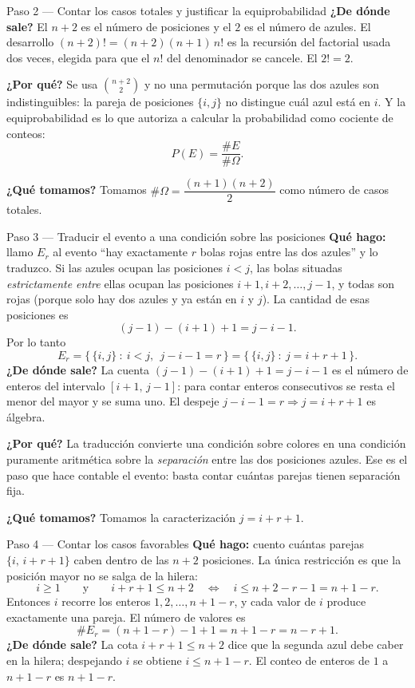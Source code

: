 \documentclass[11pt]{article}
\begin{document}
\begin{sol}
\begin{paso}{Paso 2 --- Contar los casos totales y justificar la equiprobabilidad}
\textbf{¿De dónde sale?} El $n+2$ es el número de posiciones y el $2$ es el número de azules.
El desarrollo $(n+2)!=(n+2)(n+1)\,n!$ es la recursión del factorial usada dos veces, elegida
para que el $n!$ del denominador se cancele. El $2!=2$.

\textbf{¿Por qué?} Se usa $\binom{n+2}{2}$ y no una permutación porque las dos azules son
indistinguibles: la pareja de posiciones $\{i,j\}$ no distingue cuál azul está en $i$. Y la
equiprobabilidad es lo que autoriza a calcular la probabilidad como cociente de conteos:
\[
P(E)=\frac{\#E}{\#\Omega}.
\]

\textbf{¿Qué tomamos?} Tomamos $\#\Omega=\dfrac{(n+1)(n+2)}{2}$ como número de casos totales.
\end{paso}

\begin{paso}{Paso 3 --- Traducir el evento a una condición sobre las posiciones}
\textbf{Qué hago:} llamo $E_r$ al evento ``hay exactamente $r$ bolas rojas entre las dos
azules'' y lo traduzco. Si las azules ocupan las posiciones $i<j$, las bolas situadas
\emph{estrictamente entre} ellas ocupan las posiciones $i+1,i+2,\dots,j-1$, y todas son rojas
(porque solo hay dos azules y ya están en $i$ y $j$). La cantidad de esas posiciones es
\[
(j-1)-(i+1)+1=j-i-1 .
\]
Por lo tanto
\[
E_r=\bigl\{\,\{i,j\}\ :\ i<j,\ \ j-i-1=r\,\bigr\}
=\bigl\{\,\{i,j\}\ :\ j=i+r+1\,\bigr\}.
\]
\textbf{¿De dónde sale?} La cuenta $(j-1)-(i+1)+1=j-i-1$ es el número de enteros del intervalo
$[i+1,\,j-1]$: para contar enteros consecutivos se resta el menor del mayor y se suma uno. El
despeje $j-i-1=r\Rightarrow j=i+r+1$ es álgebra.

\textbf{¿Por qué?} La traducción convierte una condición sobre colores en una condición
puramente aritmética sobre la \emph{separación} entre las dos posiciones azules. Ese es el
paso que hace contable el evento: basta contar cuántas parejas tienen separación fija.

\textbf{¿Qué tomamos?} Tomamos la caracterización $j=i+r+1$.
\end{paso}

\begin{paso}{Paso 4 --- Contar los casos favorables}
\textbf{Qué hago:} cuento cuántas parejas $\{i,\,i+r+1\}$ caben dentro de las $n+2$
posiciones. La única restricción es que la posición mayor no se salga de la hilera:
\[
i\ge 1
\qquad\text{y}\qquad
i+r+1\le n+2
\quad\Longleftrightarrow\quad
i\le n+2-r-1=n+1-r .
\]
Entonces $i$ recorre los enteros $1,2,\dots,n+1-r$, y cada valor de $i$ produce exactamente
una pareja. El número de valores es
\[
\#E_r=(n+1-r)-1+1=n+1-r=n-r+1 .
\]
\textbf{¿De dónde sale?} La cota $i+r+1\le n+2$ dice que la segunda azul debe caber en la
hilera; despejando $i$ se obtiene $i\le n+1-r$. El conteo de enteros de $1$ a $n+1-r$ es
$n+1-r$.


\end{paso}
\end{sol}
\end{document}
